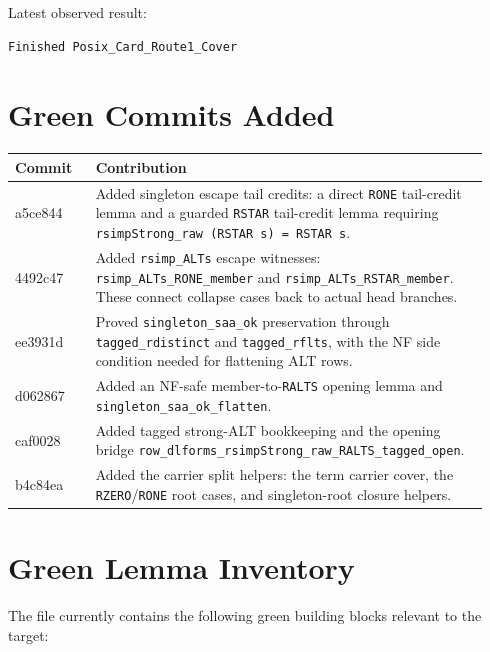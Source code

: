 \documentclass[11pt]{article}
\newcommand{\code}[1]{\texttt{\small #1}}
\begin{document}
Latest observed result:

\begin{verbatim}
Finished Posix_Card_Route1_Cover
\end{verbatim}

\clearpage

\section*{Green Commits Added}

\begin{longtable}{>{\ttfamily\small}p{0.16\linewidth}p{0.78\linewidth}}
\textbf{Commit} & \textbf{Contribution}\\
\hline
\endhead
a5ce844 & Added singleton escape tail credits: a direct \code{RONE}
tail-credit lemma and a guarded \code{RSTAR} tail-credit lemma requiring
\code{rsimpStrong\_raw (RSTAR s) = RSTAR s}.\\
4492c47 & Added \code{rsimp\_ALTs} escape witnesses:
\code{rsimp\_ALTs\_RONE\_member} and
\code{rsimp\_ALTs\_RSTAR\_member}. These connect collapse cases back to
actual head branches.\\
ee3931d & Proved \code{singleton\_saa\_ok} preservation through
\code{tagged\_rdistinct} and \code{tagged\_rflts}, with the NF side condition
needed for flattening ALT rows.\\
d062867 & Added an NF-safe member-to-\code{RALTS} opening lemma and
\code{singleton\_saa\_ok\_flatten}.\\
caf0028 & Added tagged strong-ALT bookkeeping and the opening bridge
\code{row\_dlforms\_rsimpStrong\_raw\_RALTS\_tagged\_open}.\\
b4c84ea & Added the carrier split helpers: the term carrier cover, the
\code{RZERO}/\code{RONE} root cases, and singleton-root closure helpers.\\
\end{longtable}

\section*{Green Lemma Inventory}

The file currently contains the following green building blocks relevant to
the target:
\end{document}
